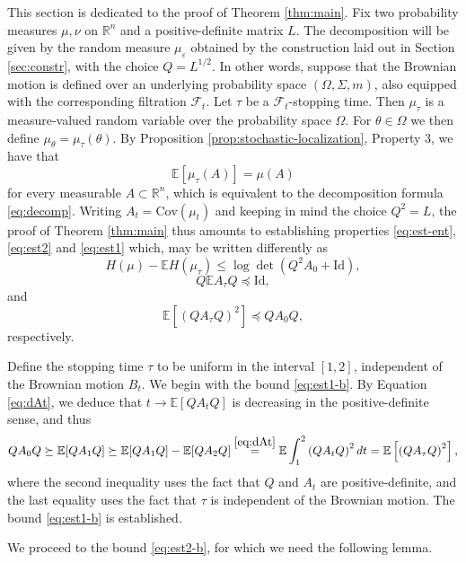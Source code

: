 \documentclass[12pt]{article}
\def \RR {\mathbb R}
\def \EE {\mathbb E}
\def \Cov {\mathrm {Cov}}
\def \eps {\varepsilon}
\def \Id {\mathrm{Id}}
\def \Cov {\mathrm{Cov}}
\def \FF {\mathcal{F}}
\theoremstyle{definition}
\theoremstyle{remark}
\begin{document}
This section is dedicated to the proof of Theorem \ref{thm:main}. Fix two probability measures $\mu, \nu$ on $\RR^n$ and a positive-definite matrix $L$. The decomposition will be given by the random measure $\mu_\eps$ obtained by the construction laid out in Section \ref{sec:constr}, with the choice $Q = L^{1/2}$. In other words, suppose that the Brownian motion is defined over an underlying probability space $(\Omega, \Sigma, m)$, also equipped with the corresponding filtration $\FF_t$. Let $\tau$ be a $\FF_t$-stopping time. Then $\mu_\tau$ is a measure-valued random variable over the probability space $\Omega$. For $\theta \in \Omega$ we then define $\mu_\theta = \mu_\tau(\theta)$. By Proposition \ref{prop:stochastic-localization}, Property 3, we have that
$$
\EE[\mu_\tau(A)] = \mu(A)
$$
for every measurable $A \subset \RR^n$, which is equivalent to the decomposition formula \eqref{eq:decomp}. Writing $A_t = \Cov(\mu_t)$ and keeping in mind the choice $Q^2 = L$, the proof of Theorem \ref{thm:main} thus amounts to establishing properties \eqref{eq:est-ent}, \eqref{eq:est2} and \eqref{eq:est1} which, may be written differently as
\begin{equation}\label{eq:est-ent-b}
H(\mu) - \EE H(\mu_\tau) \leq \log \det (Q^2 A_0 + \Id),
\end{equation}
\begin{equation}\label{eq:est2-b}
Q \EE A_\tau Q \preceq \Id,
\end{equation}
and
\begin{equation}\label{eq:est1-b}
\EE \left [ \left (Q A_\tau Q \right )^2 \right ] \preceq Q A_0 Q,
\end{equation}
respectively. 

Define the stopping time $\tau$ to be uniform in the interval $[1, 2]$, independent of the Brownian motion $B_t$. We begin with the bound \eqref{eq:est1-b}. By Equation \eqref{eq:dAt}, we deduce that $t \to \EE [Q A_t Q]$ is decreasing in the positive-definite sense, and thus
$$
Q A_0 Q \succeq \EE [Q A_1 Q] \succeq \EE [Q A_1 Q] - \EE[Q A_{2} Q] \stackrel{\eqref{eq:dAt}}{=} \EE \int_1^{2} \left (Q A_t Q\right )^2 dt = \EE\left [ \left (Q A_\tau Q \right )^2 \right ],
$$
where the second inequality uses the fact that $Q$ and $A_t$ are positive-definite, and the last equality uses the fact that $\tau$ is independent of the Brownian motion. The bound \eqref{eq:est1-b} is established.

We proceed to the bound \eqref{eq:est2-b}, for which we need the following lemma.
\end{document}

